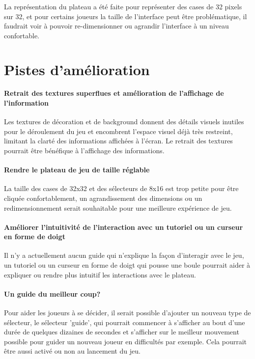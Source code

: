 \documentclass{scrreprt}
\begin{document}
			La représentation du plateau a été faite pour représenter des cases de 32 pixels sur 32, et pour certains joueurs la taille de l'interface peut être problématique, il faudrait voir à pouvoir re-dimensionner ou agrandir l'interface à un niveau confortable.
			
		\section{Pistes d'amélioration}
			\paragraph{Retrait des textures superflues et amélioration de l'affichage de l'information}
			
			Les textures de décoration et de background donnent des détails visuels inutiles pour le déroulement du jeu et encombrent l'espace visuel déjà très restreint, limitant la clarté des informations affichées à l'écran. Le retrait des textures pourrait être bénéfique à l'affichage des informations.
			
			\paragraph{Rendre le plateau de jeu de taille réglable}
			
			La taille des cases de 32x32 et des sélecteurs de 8x16 est trop petite pour être cliquée confortablement, un agrandissement des dimensions ou un redimensionnement serait souhaitable pour une meilleure expérience de jeu.
			
			\paragraph{Améliorer l'intuitivité de l'interaction avec un tutoriel ou un curseur en forme de doigt}
			
			Il n'y a actuellement aucun guide qui n'explique la façon d'interagir avec le jeu, un tutoriel ou un curseur en forme de doigt qui pousse une boule pourrait aider à expliquer ou rendre plus intuitif les interactions avec le plateau.
			
			\paragraph{Un guide du meilleur coup?}
			
			Pour aider les joueurs à se décider, il serait possible d'ajouter un nouveau type de sélecteur, le sélecteur 'guide', qui pourrait commencer à s'afficher au bout d'une durée de quelques dizaines de secondes et s'afficher sur le meilleur mouvement possible pour guider un nouveau joueur en difficultés par exemple. Cela pourrait être aussi activé ou non au lancement du jeu.
		
\end{document}

